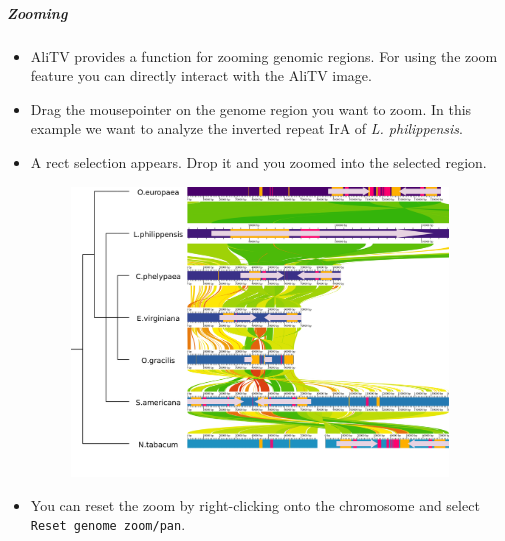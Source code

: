 \documentclass[a4paper]{scrartcl}
\begin{document}
\subparagraph*{Zooming}
\begin{itemize}
	\item AliTV provides a function for zooming genomic regions. For using the zoom feature you can directly interact with the AliTV image.
	\item Drag the mousepointer on the genome region you want to zoom. In this example we want to analyze the inverted repeat IrA of \textit{L. philippensis}.
	\item A rect selection appears. Drop it and you zoomed into the selected region.
	
	\begin{figure}[H]
		\centering
		\includegraphics[width=10cm]{zoom.png}
		\caption{}
	\end{figure}
	
	\item You can reset the zoom by right-clicking onto the chromosome and select \texttt{Reset genome zoom/pan}.
\end{itemize}
\end{document}
